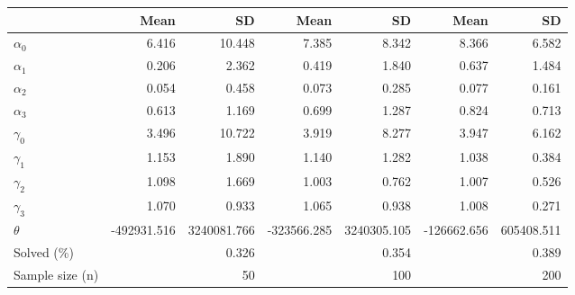 
\begin{tabular}[t]{lrrrrrr}
\toprule
  & Mean & SD & Mean  & SD  & Mean   & SD  \\
\midrule
$\alpha_{0}$ & 6.416 & 10.448 & 7.385 & 8.342 & 8.366 & 6.582\\
$\alpha_{1}$ & 0.206 & 2.362 & 0.419 & 1.840 & 0.637 & 1.484\\
$\alpha_{2}$ & 0.054 & 0.458 & 0.073 & 0.285 & 0.077 & 0.161\\
$\alpha_{3}$ & 0.613 & 1.169 & 0.699 & 1.287 & 0.824 & 0.713\\
$\gamma_{0}$ & 3.496 & 10.722 & 3.919 & 8.277 & 3.947 & 6.162\\
$\gamma_{1}$ & 1.153 & 1.890 & 1.140 & 1.282 & 1.038 & 0.384\\
$\gamma_{2}$ & 1.098 & 1.669 & 1.003 & 0.762 & 1.007 & 0.526\\
$\gamma_{3}$ & 1.070 & 0.933 & 1.065 & 0.938 & 1.008 & 0.271\\
$\theta$ & -492931.516 & 3240081.766 & -323566.285 & 3240305.105 & -126662.656 & 605408.511\\
Solved (\%) &  & 0.326 &  & 0.354 &  & 0.389\\
Sample size (n) &  & 50 &  & 100 &  & 200\\
\bottomrule
\end{tabular}
